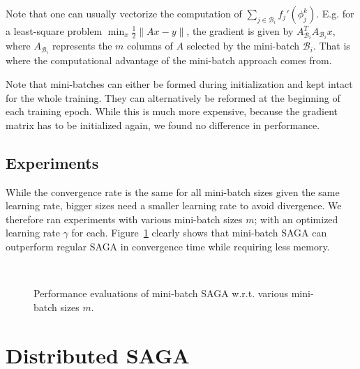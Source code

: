 \documentclass[a4paper,10pt]{article}
\newcommand{\B}{\mathcal{B}}
\newcommand{\figref}[1]{Figure~\ref{fig:#1}}
\begin{document}
Note that one can usually vectorize the computation of $\sum_{j\in\B_i}
f_j'(\phi_j^k)$. E.g. for a least-square problem $\min_x \frac12 \|Ax - y\|$,
the gradient is given by $A_{\B_i}^T A_{\B_i} x$, where $A_{\B_i}$ represents
the $m$ columns of $A$ selected by the mini-batch $\B_i$. That is where the
computational advantage of the mini-batch approach comes from.

Note that mini-batches can either be formed during initialization and kept
intact for the whole training. They can alternatively be reformed at the
beginning of each training epoch. While this is much more expensive, because the
gradient matrix has to be initialized again, we found no difference in
performance.

\subsection{Experiments}

While the convergence rate is the same for all mini-batch sizes given the same
learning rate, bigger sizes need a smaller learning rate to avoid divergence.
We therefore ran experiments with various mini-batch sizes $m$; with an
optimized learning rate $\gamma$ for each. \figref{eval_saga_mb} clearly shows
that mini-batch SAGA can outperform regular SAGA in convergence time while
requiring less memory.

\begin{figure}[ht]
	\centering
	\hspace{0pt}
	\\
	\caption{Performance evaluations of mini-batch SAGA w.r.t. various
	mini-batch sizes $m$.}
	\label{fig:eval_saga_mb}
\end{figure}

\section{Distributed SAGA}
\end{document}
